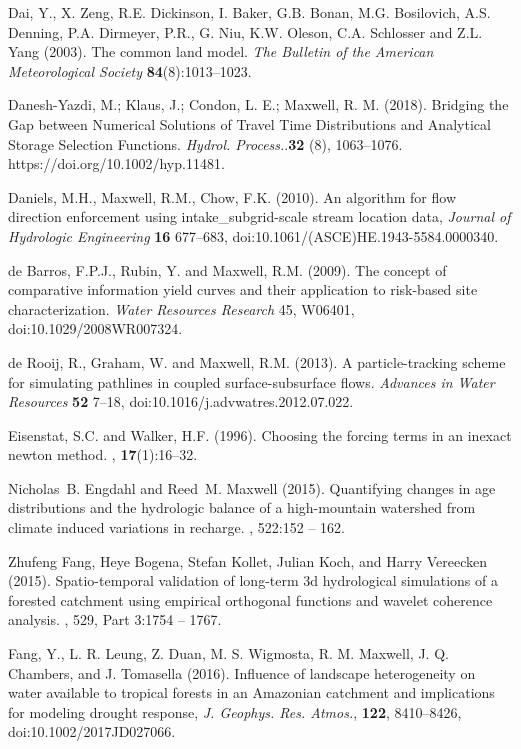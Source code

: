 \begin{thebibliography}{999}
Dai, Y., X. Zeng, R.E. Dickinson, I. Baker, G.B. Bonan, M.G. Bosilovich, A.S. Denning, P.A. Dirmeyer, P.R., G. Niu, K.W. Oleson, C.A. Schlosser and Z.L. Yang (2003). The common land model. {\em The Bulletin of the American Meteorological Society} {\bf 84}(8):1013--1023.

Danesh-Yazdi, M.; Klaus, J.; Condon, L. E.; Maxwell, R. M. (2018). Bridging the Gap between Numerical Solutions of Travel Time Distributions and Analytical Storage Selection Functions. {\em Hydrol. Process.}.{\bf 32} (8), 1063–1076. https://doi.org/10.1002/hyp.11481.

Daniels, M.H., Maxwell, R.M., Chow, F.K. (2010). An algorithm for flow direction enforcement using intake_subgrid-scale stream location data, {\em Journal of Hydrologic Engineering} {\bf 16} 677--683, doi:10.1061/(ASCE)HE.1943-5584.0000340.

de Barros, F.P.J., Rubin, Y. and Maxwell, R.M. (2009). The concept of comparative information yield curves and their application to risk-based site characterization. {\em Water Resources Research} 45, W06401, doi:10.1029/2008WR007324.

de Rooij, R., Graham, W. and Maxwell, R.M. (2013). A particle-tracking scheme for simulating pathlines in coupled surface-subsurface flows. {\em Advances in Water Resources} {\bf 52} 7--18, doi:10.1016/j.advwatres.2012.07.022.

Eisenstat, S.C. and Walker, H.F. (1996).
\newblock Choosing the forcing terms in an inexact newton method.
, {\bf 17}(1):16--32.

	Nicholas~B. Engdahl and Reed~M. Maxwell (2015).
\newblock Quantifying changes in age distributions and the hydrologic balance
  of a high-mountain watershed from climate induced variations in recharge.
, 522:152 -- 162.

	Zhufeng Fang, Heye Bogena, Stefan Kollet, Julian Koch, and Harry Vereecken (2015).
\newblock Spatio-temporal validation of long-term 3d hydrological simulations
  of a forested catchment using empirical orthogonal functions and wavelet
  coherence analysis.
, 529, Part 3:1754 -- 1767.

Fang, Y., L. R. Leung, Z. Duan, M. S. Wigmosta, R. M. Maxwell, J. Q. Chambers, and J. Tomasella (2016). Influence of landscape heterogeneity on water available to tropical forests in an Amazonian catchment and implications for modeling drought response, {\em J. Geophys. Res. Atmos.}, {\bf 122}, 8410–8426, doi:10.1002/2017JD027066.



\end{thebibliography}
